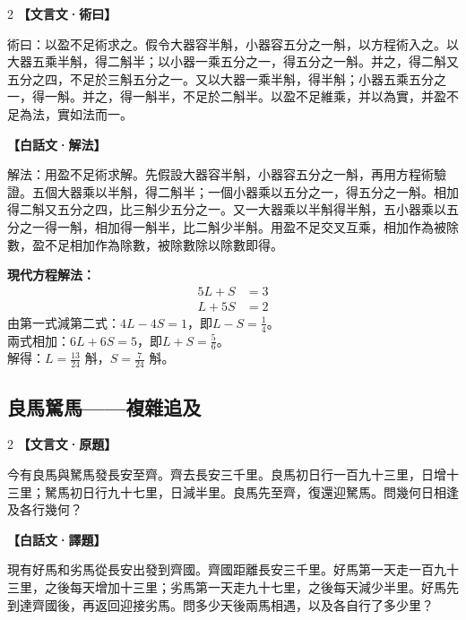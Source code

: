 \documentclass[11pt,a4paper]{article}
\newcommand{\zhc}{}[1]{{\CJKfamily{\CJKrmdefault}#1}}  %
\newcommand{\zhm}[1]{{\CJKfamily{\CJKrmdefault}#1}}  %
\newenvironment{prob bilingual}[1][]{%
  \begin{paracol}{2}%
  \setlength{\columnseprule}{0.4pt}%
}{%
  \end{paracol}%
  \medskip%
}
\begin{document}
\begin{paracol}{2}
\switchcolumn[0]
\noindent\textbf{\textcolor{notecolor}{\zhc{【文言文·術曰】}}}\par\smallskip
\zhc{
術曰：以盈不足術求之。假令大器容半斛，小器容五分之一斛，以方程術入之。以大器五乘半斛，得二斛半；以小器一乘五分之一，得五分之一斛。并之，得二斛又五分之四，不足於三斛五分之一。又以大器一乘半斛，得半斛；小器五乘五分之一，得一斛。并之，得一斛半，不足於二斛半。以盈不足維乘，并以為實，并盈不足為法，實如法而一。
}

\switchcolumn[1]
\noindent\textbf{\textcolor{notecolor}{\zhm{【白話文·解法】}}}\par\smallskip
\zhm{
解法：用盈不足術求解。先假設大器容半斛，小器容五分之一斛，再用方程術驗證。五個大器乘以半斛，得二斛半；一個小器乘以五分之一，得五分之一斛。相加得二斛又五分之四，比三斛少五分之一。又一大器乘以半斛得半斛，五小器乘以五分之一得一斛，相加得一斛半，比二斛少半斛。用盈不足交叉互乘，相加作為被除數，盈不足相加作為除數，被除數除以除數即得。
}
\end{paracol}

\medskip

\noindent\textbf{\textcolor{sectioncolor}{\zhc{現代方程解法：}}}
\begin{align*}
5L + S &= 3 \\
L + 5S &= 2
\end{align*}
由第一式減第二式：$4L - 4S = 1$，即$L - S = \frac{1}{4}$。\\
兩式相加：$6L + 6S = 5$，即$L + S = \frac{5}{6}$。\\
解得：$L = \frac{13}{24}$ 斛，$S = \frac{7}{24}$ 斛。

\vspace{0.5cm}

\subsection{\zhc{良馬駑馬——複雜追及}}

\begin{paracol}{2}
\switchcolumn[0]
\noindent\textbf{\textcolor{notecolor}{\zhc{【文言文·原題】}}}\par\smallskip
\zhc{
今有良馬與駑馬發長安至齊。齊去長安三千里。良馬初日行一百九十三里，日增十三里；駑馬初日行九十七里，日減半里。良馬先至齊，復還迎駑馬。問幾何日相逢及各行幾何？
}

\switchcolumn[1]
\noindent\textbf{\textcolor{notecolor}{\zhm{【白話文·譯題】}}}\par\smallskip
\zhm{
現有好馬和劣馬從長安出發到齊國。齊國距離長安三千里。好馬第一天走一百九十三里，之後每天增加十三里；劣馬第一天走九十七里，之後每天減少半里。好馬先到達齊國後，再返回迎接劣馬。問多少天後兩馬相遇，以及各自行了多少里？
}
\end{paracol}
\end{document}
